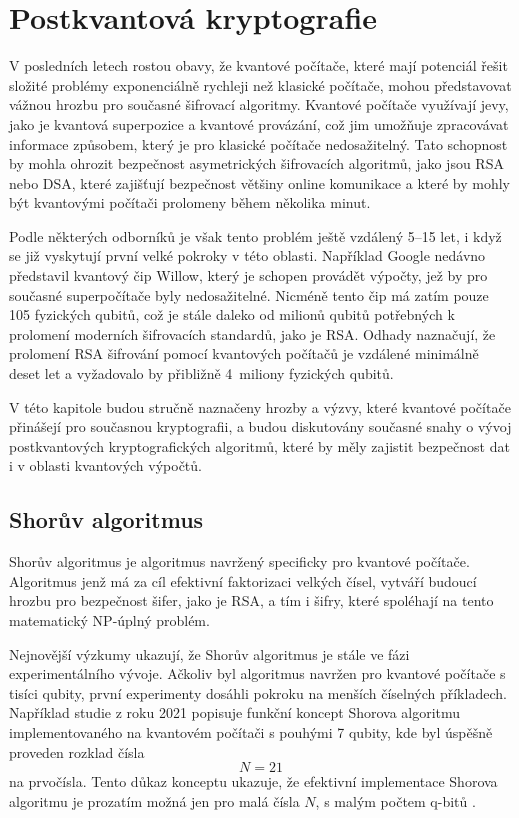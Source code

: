 \section{Postkvantová kryptografie}
\label{sec:postkvantova-kryptografie}
V posledních letech rostou obavy, že kvantové počítače, které mají potenciál řešit složité problémy exponenciálně rychleji než klasické počítače, mohou představovat vážnou hrozbu pro současné šifrovací algoritmy. Kvantové počítače využívají jevy, jako je kvantová superpozice a kvantové provázání, což jim umožňuje zpracovávat informace způsobem, který je pro klasické počítače nedosažitelný. Tato schopnost by mohla ohrozit bezpečnost asymetrických šifrovacích algoritmů, jako jsou RSA nebo DSA, které zajišťují bezpečnost většiny online komunikace a které by mohly být kvantovými počítači prolomeny během několika minut\mbox{\parencite{qubits2024}.}

Podle některých odborníků je však tento problém ještě vzdálený 5--15 let, i když se již vyskytují první velké pokroky v této oblasti. Například Google nedávno představil kvantový čip Willow, který je schopen provádět výpočty, jež by pro současné superpočítače byly nedosažitelné. Nicméně tento čip má zatím pouze 105 fyzických qubitů, což je stále daleko od milionů qubitů potřebných k prolomení moderních šifrovacích standardů, jako je RSA. Odhady naznačují, že prolomení RSA šifrování pomocí kvantových počítačů je vzdálené minimálně deset let a vyžadovalo by přibližně 4~miliony fyzických qubitů\parencite{qubits2024}.

V této kapitole budou stručně naznačeny hrozby a výzvy, které kvantové počítače přinášejí pro současnou kryptografii, a budou diskutovány současné snahy o vývoj postkvantových kryptografických algoritmů, které by měly zajistit bezpečnost dat i v oblasti kvantových výpočtů.

\subsection{Shorův algoritmus}
Shorův algoritmus je algoritmus navržený specificky pro kvantové počítače. Algoritmus jenž má za cíl efektivní faktorizaci velkých čísel, vytváří budoucí hrozbu pro bezpečnost šifer, jako je RSA, a tím i šifry, které spoléhají na tento matematický NP-úplný problém.

Nejnovější výzkumy ukazují, že Shorův algoritmus je stále ve fázi experimentálního vývoje. Ačkoliv byl algoritmus navržen pro kvantové počítače s tisíci qubity, první experimenty dosáhli pokroku na menších číselných příkladech. Například studie z roku 2021 popisuje funkční koncept Shorova algoritmu implementovaného na kvantovém počítači s pouhými 7 qubity, kde byl úspěšně proveden rozklad čísla \[N = 21\] na prvočísla. Tento důkaz konceptu ukazuje, že efektivní implementace Shorova algoritmu je prozatím možná jen pro malá čísla \(N\), s malým počtem q-bitů \mbox{\parencite{skosana2021}.}

